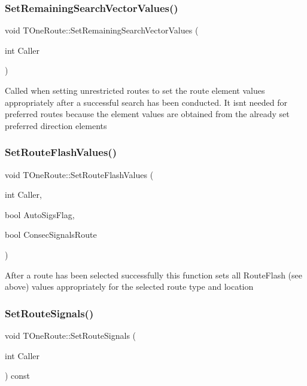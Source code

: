 \subsubsection{\texorpdfstring{Set\+Remaining\+Search\+Vector\+Values()}{SetRemainingSearchVectorValues()}}
{\footnotesize\ttfamily void T\+One\+Route\+::\+Set\+Remaining\+Search\+Vector\+Values (\begin{DoxyParamCaption}\item[{int}]{Caller }\end{DoxyParamCaption})}

Called when setting unrestricted routes to set the route element values appropriately after a successful search has been conducted. It isn\textquotesingle{}t needed for preferred routes because the element values are obtained from the already set preferred direction elements \mbox{\label{class_t_one_route_abdb89bb3f7ce55d926bee3c2d4b3652f}} 
\subsubsection{\texorpdfstring{Set\+Route\+Flash\+Values()}{SetRouteFlashValues()}}
{\footnotesize\ttfamily void T\+One\+Route\+::\+Set\+Route\+Flash\+Values (\begin{DoxyParamCaption}\item[{int}]{Caller,  }\item[{bool}]{Auto\+Sigs\+Flag,  }\item[{bool}]{Consec\+Signals\+Route }\end{DoxyParamCaption})}

After a route has been selected successfully this function sets all Route\+Flash (see above) values appropriately for the selected route type and location \mbox{\label{class_t_one_route_a4dfe3a028da7a4b6df0f44f33c3e2196}} 
\subsubsection{\texorpdfstring{Set\+Route\+Signals()}{SetRouteSignals()}}
{\footnotesize\ttfamily void T\+One\+Route\+::\+Set\+Route\+Signals (\begin{DoxyParamCaption}\item[{int}]{Caller }\end{DoxyParamCaption}) const}


